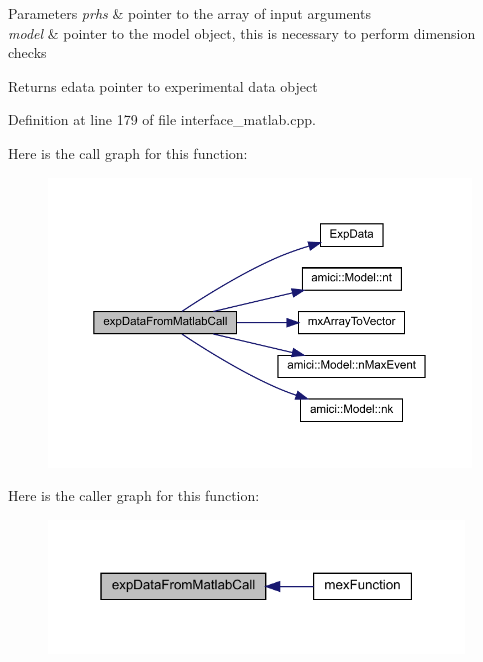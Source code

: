 \begin{DoxyParams}{Parameters}
{\em prhs} & pointer to the array of input arguments \\
\hline
{\em model} & pointer to the model object, this is necessary to perform dimension checks \\
\hline
\end{DoxyParams}
\begin{DoxyReturn}{Returns}
edata pointer to experimental data object 
\end{DoxyReturn}


Definition at line 179 of file interface\+\_\+matlab.\+cpp.

Here is the call graph for this function\+:
\nopagebreak
\begin{figure}[H]
\begin{center}
\leavevmode
\includegraphics[width=350pt]{namespaceamici_a186dd3debfe185669f305464f161e4bb_cgraph}
\end{center}
\end{figure}
Here is the caller graph for this function\+:
\nopagebreak
\begin{figure}[H]
\begin{center}
\leavevmode
\includegraphics[width=313pt]{namespaceamici_a186dd3debfe185669f305464f161e4bb_icgraph}
\end{center}
\end{figure}
\mbox{\label{namespaceamici_aeb0886d5a74ea04eeef52219063aa7d4}} 
